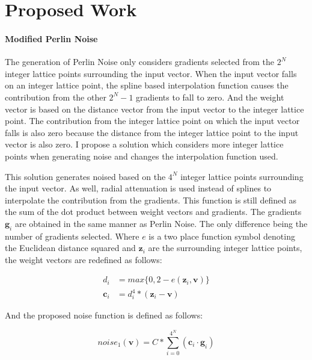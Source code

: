 \documentclass[12pt]{article}
\theoremstyle{definition}
\theoremstyle{remark}
\begin{document}
\singlespacing
\section{Proposed Work}
\doublespacing

\paragraph{Modified Perlin Noise} 

The generation of Perlin Noise only considers gradients selected from the $2^N$ integer lattice points surrounding the input vector. When the input vector falls on an integer lattice point, the spline based interpolation function causes the contribution from the other $2^N-1$ gradients to fall to zero. And the weight vector is based on the distance vector from the input vector to the integer lattice point. The contribution from the integer lattice point on which the input vector falls is also zero because the distance from the integer lattice point to the input vector is also zero. I propose a solution which considers more integer lattice points when generating noise and changes the interpolation function used.

This solution generates noised based on the $4^N$ integer lattice points surrounding the input vector. As well, radial attenuation is used instead of splines to interpolate the contribution from the gradients. This function is still defined as the sum of the dot product between weight vectors and gradients. The gradients $\textbf{g}_i$ are obtained in the same manner as Perlin Noise. The only difference being the number of gradients selected. Where $e$ is a two place function symbol denoting the Euclidean distance squared and $\textbf{z}_i$ are the surrounding integer lattice points, the weight vectors are redefined as follows:

\begin{align*}
d_i &= max\{0, 2 - e(\textbf{z}_i,\textbf{v})\} \\
\textbf{c}_i &= d_i^4 * (\textbf{z}_i - \textbf{v})
\end{align*}

And the proposed noise function is defined as follows:

\begin{equation*}
	noise_1(\textbf{v})=C*\sum_{i=0}^{4^N}(\textbf{c}_i \cdot \textbf{g}_i)
\end{equation*}
\end{document}
